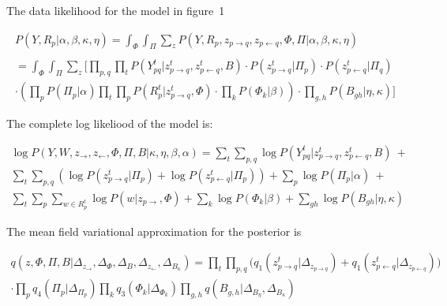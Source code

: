 The data likelihood for the model in figure~1

\begin{eqnarray}
P(Y, R_{p} | \alpha, \beta, \kappa, \eta) = \int_{\Phi} \! \int_{\Pi} \sum_{z} \! P(Y, R_{p}, z_{p \rightarrow q}, z_{p \leftarrow q}, \Phi, \Pi | 
\alpha, \beta, \kappa, \eta)  \nonumber \\  \nonumber
\\ = \int_{\Phi} \! \int_{\Pi} \sum_{z} \! \bigg[ \prod_{p,q} \prod_{t}
P(Y_{pq}^{t} | z_{p \rightarrow q}^{t}, z_{p \leftarrow q}^{t}, B) 
\cdot P(z_{p \rightarrow q}^{t} | \Pi_{p}) \cdot P(z_{p \leftarrow q}^{t} |
\Pi_{q})  \nonumber
\\ \cdot \left(\prod_{p} P(\Pi_{p} | \alpha) \prod_{t} \prod_{p} P(R_{p}^{t} |
z_{p \rightarrow q}^{t}, \Phi) \cdot \prod_{k} P(\Phi_{k} | \beta)\right) \cdot
\prod_{g,h}P(B_{gh} | \eta, \kappa) \bigg]
\end{eqnarray}

The complete log likeliood of the model is:

\begin{align}
\log \! P(Y, W, z_{\rightarrow}, z_{\leftarrow}, \Phi, \Pi, B | \kappa, \eta,
\beta, \alpha) = \sum_{t} \! \sum_{p,q} \! \log P(Y_{pq}^{t} | z_{p \rightarrow
q}^{t} , z_{p \leftarrow q}^{t}, B)~+ \nonumber  \\\nonumber \sum_{t} \!
\sum_{p,q} \! (\log P(z_{p \rightarrow q}^{t} | \Pi_{p}) + \log \! P(z_{p \leftarrow q}^{t} |
\Pi_{p})) + \sum_{p} \! \log \! P(\Pi_{p} | \alpha) ~+\\  \sum_{t} \!
\sum_{p} \! \sum_{w \in R_{p}^{t}} \log P(w | z_{p \rightarrow}, \Phi) +
\sum_{k} \! \log P(\Phi_{k} | \beta) + \sum_{gh} \! \log P(B_{gh} | \eta,
\kappa)
\end{align}

The mean field variational approximation for the posterior is 

\begin{align}
q(z, \Phi, \Pi, B | \Delta_{z_{\rightarrow}}, \Delta_{\Phi}, \Delta_{B},
\Delta_{z_{\leftarrow}}, \Delta_{B_{\kappa}}) = \prod_{t} \! \prod_{p,q} \!
\bigg( q_{1}(z_{p \rightarrow q}^{t} | \Delta_{z_{p \rightarrow q}}) +
q_{1}(z_{p \leftarrow q}^{t} | \Delta_{z_{p \leftarrow q}})  \bigg) \nonumber \\
\cdot \prod_{p} \! q_{4}(\Pi_{p} | \Delta_{\Pi_{p}}) \prod_{k} q_{3} (\Phi_{k} |
\Delta_{\Phi_{k}}) \prod_{g,h} \! q(B_{g,h} | \Delta_{B_{\eta}}, \Delta_{B_{\kappa}})
\end{align}

